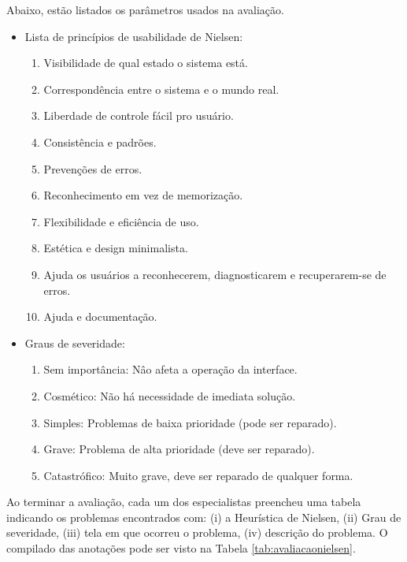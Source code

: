 Abaixo, estão listados os parâmetros usados na avaliação.

\begin{itemize}
    \item Lista de princípios de usabilidade de Nielsen:
    \begin{enumerate}
        \item Visibilidade de qual estado o sistema está.
        \item Correspondência entre o sistema e o mundo real.
        \item Liberdade de controle fácil pro usuário.
        \item Consistência e padrões.
        \item Prevenções de erros.
        \item Reconhecimento em vez de memorização.
        \item Flexibilidade e eficiência de uso.
        \item Estética e design minimalista.
        \item Ajuda os usuários a reconhecerem, diagnosticarem e recuperarem-se de erros.
        \item Ajuda e documentação.
    \end{enumerate}

    \item Graus de severidade:
    \begin{enumerate}
        \addtocounter{enumi}{-1} %
        \item Sem importância: Nâo afeta a operação da interface.
        \item Cosmético: Não há necessidade de imediata solução.
        \item Simples: Problemas de baixa prioridade (pode ser reparado).
        \item Grave: Problema de alta prioridade (deve ser reparado).
        \item Catastrófico: Muito grave, deve ser reparado de qualquer forma.
    \end{enumerate}
\end{itemize}

Ao terminar a avaliação, cada um dos especialistas preencheu uma tabela indicando os problemas encontrados com: (i) a Heurística de Nielsen, (ii) Grau de severidade, (iii) tela em que ocorreu o problema, (iv) descrição do problema. O compilado das anotações pode ser visto na Tabela \ref{tab:avaliacaonielsen}.

